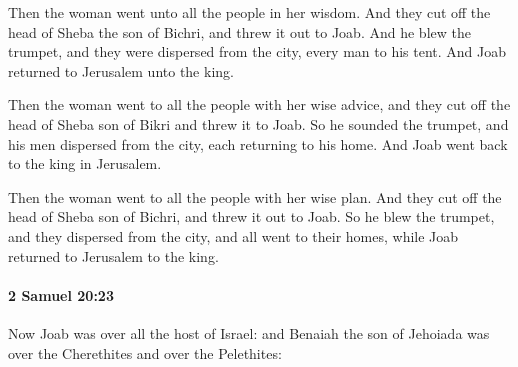 			\begin{versebox}
					\item[BHS] 
					\item[ASV] Then the woman went unto all the people in her wisdom. And they cut off the head of Sheba the son of Bichri, and threw it out to Joab. And he blew the trumpet, and they were dispersed from the city, every man to his tent. And Joab returned to Jerusalem unto the king.
					\item[NIV] Then the woman went to all the people with her wise advice, and they cut off the head of Sheba son of Bikri and threw it to Joab. So he sounded the trumpet, and his men dispersed from the city, each returning to his home. And Joab went back to the king in Jerusalem.
					\item[NRSV] Then the woman went to all the people with her wise plan. And they cut off the head of Sheba son of Bichri, and threw it out to Joab. So he blew the trumpet, and they dispersed from the city, and all went to their homes, while Joab returned to Jerusalem to the king.
			\end{versebox}

		\paragraph{2 Samuel 20:23} %
			\label{2SAMUEL-20-23}

			Now Joab was over all the host of Israel: and Benaiah the son of Jehoiada was over the Cherethites and over the Pelethites:

